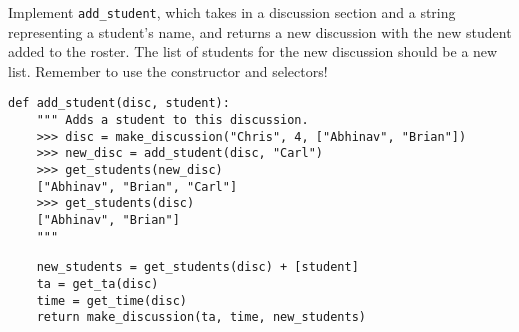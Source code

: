 \question
Implement {\tt add\_student}, which takes in a discussion section and a string
representing a student's name, and returns a new discussion with the new
student added to the roster. The list of students for the new discussion should
be a new list. Remember to use the constructor and selectors!

\begin{lstlisting}
def add_student(disc, student):
    """ Adds a student to this discussion.
    >>> disc = make_discussion("Chris", 4, ["Abhinav", "Brian"])
    >>> new_disc = add_student(disc, "Carl")
    >>> get_students(new_disc)
    ["Abhinav", "Brian", "Carl"]
    >>> get_students(disc)
    ["Abhinav", "Brian"]
    """
\end{lstlisting}

\begin{solution}
\begin{lstlisting}
    new_students = get_students(disc) + [student]
    ta = get_ta(disc)
    time = get_time(disc)
    return make_discussion(ta, time, new_students)
\end{lstlisting}
\end{solution}
